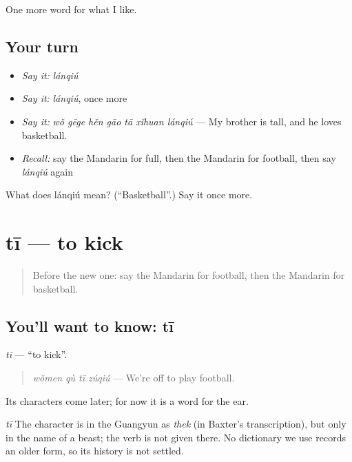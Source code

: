\begin{grammarlens}[title={What you've built}]
One more word for what I like.
\end{grammarlens}

\subsection*{Your turn}
\begin{itemize}
\raggedright
  \item \emph{Say it:} \emph{lánqiú}
  \item \emph{Say it:} \emph{lánqiú}, once more
  \item \emph{Say it:} \emph{wǒ gēge hěn gāo tā xǐhuan lánqiú} — My brother is tall, and he loves basketball.
  \item \emph{Recall:} say the Mandarin for full, then the Mandarin for football, then say \emph{lánqiú} again
\end{itemize}

\begin{tcolorbox}[breakable,colback=teal!4,colframe=teal!35!black,title={Before you move on}]
What does lánqiú mean? (\textquotedblleft{}Basketball\textquotedblright{}.) Say it once more.
\end{tcolorbox}
\section[tī]{tī — to kick}

\label{lesson:ZH-C135-ti}



\begin{quote}
Before the new one: say the Mandarin for football, then the Mandarin for basketball.
\end{quote}

\subsection*{You'll want to know: tī}
\emph{tī} — \textquotedblleft{}to kick\textquotedblright{}.

\begin{quote}
\emph{wǒmen qù tī zúqiú} — We're off to play football.
\end{quote}

Its characters come later; for now it is a word for the ear.

\begin{cousinweb}
\emph{tī} The character is in the Guangyun as \emph{thek} (in Baxter's transcription), but only in the name of a beast; the verb is not given there. No dictionary we use records an older form, so its history is not settled.
\end{cousinweb}

